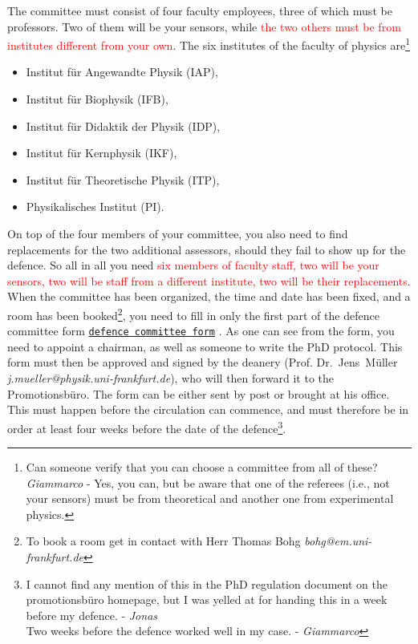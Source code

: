 \documentclass[a4paper]{article}
\newcommand{\attention}[1]{\textcolor{red}{#1}}
\newcommand{\file}[2][]{%
    \ifthenelse{\isempty{#1}}%
        {\textcolor{fileColor}{#2}}%
        {\href{run:#1}{\texttt{\textcolor{fileColor}{#2}}}}%
}
\begin{document}
        The committee must consist of four faculty employees, three of which must be professors.
        Two of them will be your sensors, while \attention{the two others must be from institutes different from your own}.
        The six institutes of the faculty of physics are\footnote{Can someone verify that you can choose a committee from all of these? \emph{Giammarco} - Yes, you can, but be aware that one of the referees (i.e., not your sensors) must be from theoretical  and another one from experimental physics.}
        \begin{multicols}{2}
          \begin{itemize}
            \item Institut f\"ur Angewandte Physik (IAP),
            \item Institut f\"ur Biophysik (IFB),
            \item Institut f\"ur Didaktik der Physik (IDP),
            \item Institut f\"ur Kernphysik (IKF),
            \item Institut f\"ur Theoretische Physik (ITP),
            \item Physikalisches Institut (PI).
          \end{itemize}
        \end{multicols}
        \noindent On top of the four members of your committee, you also need to find replacements for the two additional assessors, should they fail to show up for the defence.
        So all in all you need \attention{six members of faculty staff, two will be your sensors, two will be staff from a different institute, two will be their replacements}.
        When the committee has been organized, the time and date has been fixed, and a room has been booked\footnote{To book a room get in contact with Herr Thomas Bohg \emph{bohg@em.uni-frankfurt.de}}, you need to fill in only the first part of the \file[Pruefungskommission.pdf]{defence committee form}.
        As one can see from the form, you need to appoint a chairman, as well as someone to write the PhD protocol.
        This form must then be approved and signed by the deanery (Prof. Dr.~Jens~Müller  \emph{j.mueller@physik.uni-frankfurt.de}), who will then forward it to the Promotionsb\"uro. The form can be either sent by post or brought at his office.
        This must happen before the circulation can commence, and must therefore be in order at least four weeks before the date of the defence\footnote{I cannot find any mention of this in the PhD regulation document on the promotionsb\"uro homepage, but I was yelled at for handing this in a week before my defence. - \emph{Jonas} \\ Two weeks before the defence worked well in my case. - \emph{Giammarco}}.
\end{document}
